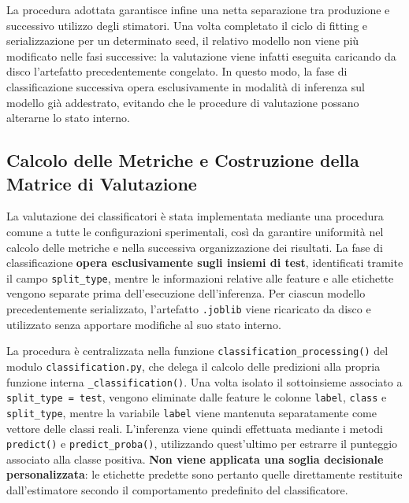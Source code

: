 La procedura adottata garantisce infine una netta separazione tra produzione e successivo utilizzo degli stimatori. 
Una volta completato il ciclo di fitting e serializzazione per un determinato seed, il relativo modello non viene più modificato nelle fasi successive: la valutazione viene infatti eseguita caricando da disco l'artefatto precedentemente congelato. 
In questo modo, la fase di classificazione successiva opera esclusivamente in modalità di inferenza sul modello già addestrato, evitando che le procedure di valutazione possano alterarne lo stato interno.

\subsection{Calcolo delle Metriche e Costruzione della Matrice di Valutazione}
\label{subsec:calcolo_metriche_hk}

La valutazione dei classificatori è stata implementata mediante una procedura comune a tutte le configurazioni sperimentali, così da garantire uniformità nel calcolo delle metriche e nella successiva organizzazione dei risultati. La fase di classificazione \textbf{opera esclusivamente sugli insiemi di test}, identificati tramite il campo \texttt{split\_type}, mentre le informazioni relative alle feature e alle etichette vengono separate prima dell'esecuzione dell'inferenza. 
Per ciascun modello precedentemente serializzato, l'artefatto \texttt{.joblib} viene ricaricato da disco e utilizzato senza apportare modifiche al suo stato interno.

La procedura è centralizzata nella funzione \texttt{classification\_processing()} del modulo \newline \texttt{classification.py}, che delega il calcolo delle predizioni alla propria funzione interna \newline \texttt{\_classification()}. 
Una volta isolato il sottoinsieme associato a \texttt{split\_type = test}, vengono eliminate dalle feature le colonne \texttt{label}, \texttt{class} e \texttt{split\_type}, mentre la variabile \texttt{label} viene mantenuta separatamente come vettore delle classi reali. 
L'inferenza viene quindi effettuata mediante i metodi \texttt{predict()} e \texttt{predict\_proba()}, utilizzando quest'ultimo per estrarre il punteggio associato alla classe positiva. 
\textbf{Non viene applicata una soglia decisionale personalizzata}: le etichette predette sono pertanto quelle direttamente restituite dall'estimatore secondo il comportamento predefinito del classificatore.

